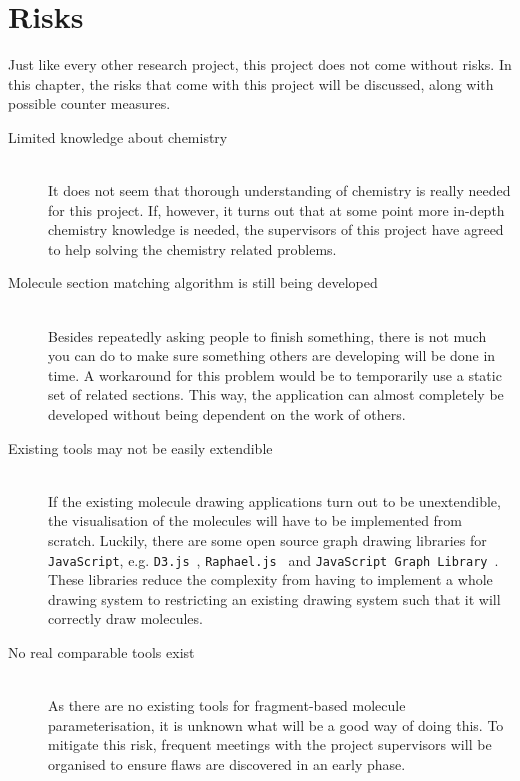 \chapter{Risks}

Just like every other research project, this project does not come without risks. In this chapter, the risks that come with this project will be discussed, along with possible counter measures.

\begin{description}
\item[Limited knowledge about chemistry]~~\\
It does not seem that thorough understanding of chemistry is really needed for this project. If, however, it turns out that at some point more in-depth chemistry knowledge is needed, the supervisors of this project have agreed to help solving the chemistry related problems.

\item[Molecule section matching algorithm is still being developed]~~\\
Besides repeatedly asking people to finish something, there is not much you can do to make sure something others are developing will be done in time. A workaround for this problem would be to temporarily use a static set of related sections. This way, the application can almost completely be developed without being dependent on the work of others.

\item[Existing tools may not be easily extendible]~~\\
If the existing molecule drawing applications turn out to be unextendible, the visualisation of the molecules will have to be implemented from scratch. Luckily, there are some open source graph drawing libraries for \verb|JavaScript|, e.g. \verb|D3.js|~\cite{bostock2012data}, \verb|Raphael.js|~\cite{baranovski2013raphael} and \verb|JavaScript Graph Library|~\cite{dracula2012javascript}. These libraries reduce the complexity from having to implement a whole drawing system to restricting an existing drawing system such that it will correctly draw molecules. 

\item[No real comparable tools exist]~~\\
As there are no existing tools for fragment-based molecule parameterisation, it is unknown what will be a good way of doing this. To mitigate this risk, frequent meetings with the project supervisors will be organised to ensure flaws are discovered in an early phase.
\end{description}
